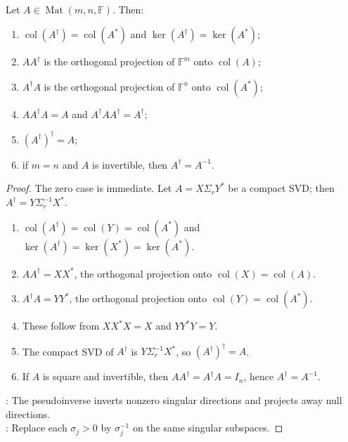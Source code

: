 \begin{theorem} \label{thm:moore-penrose-basic-properties} \\
Let $A\in\operatorname{Mat}(m,n,\mathbb{F})$. Then:
\begin{enumerate}[label=(\roman*)]
\setlength{\itemsep}{0pt}
\item $\operatorname{col}(A^{\dagger})=\operatorname{col}(A^*)$ and $\ker(A^{\dagger})=\ker(A^*)$;
\item $AA^{\dagger}$ is the orthogonal projection of $\mathbb{F}^m$ onto $\operatorname{col}(A)$;
\item $A^{\dagger}A$ is the orthogonal projection of $\mathbb{F}^n$ onto $\operatorname{col}(A^*)$;
\item $AA^{\dagger}A=A$ and $A^{\dagger}AA^{\dagger}=A^{\dagger}$;
\item $(A^{\dagger})^{\dagger}=A$;
\item if $m=n$ and $A$ is invertible, then $A^{\dagger}=A^{-1}$.
\end{enumerate}
\begin{proof}
The zero case is immediate. Let $A=X\Sigma_rY^*$ be a compact SVD; then $A^{\dagger}=Y\Sigma_r^{-1}X^*$.
\begin{enumerate}[label=(\roman*)]
\setlength{\itemsep}{0pt}
\item $\operatorname{col}(A^{\dagger})=\operatorname{col}(Y)=\operatorname{col}(A^*)$ and $\ker(A^{\dagger})=\ker(X^*)=\ker(A^*)$.
\item $AA^{\dagger}=XX^*$, the orthogonal projection onto $\operatorname{col}(X)=\operatorname{col}(A)$.
\item $A^{\dagger}A=YY^*$, the orthogonal projection onto $\operatorname{col}(Y)=\operatorname{col}(A^*)$.
\item These follow from $XX^*X=X$ and $YY^*Y=Y$.
\item The compact SVD of $A^{\dagger}$ is $Y\Sigma_r^{-1}X^*$, so $(A^{\dagger})^{\dagger}=A$.
\item If $A$ is square and invertible, then $AA^{\dagger}=A^{\dagger}A=I_n$, hence $A^{\dagger}=A^{-1}$.
\end{enumerate}
: The pseudoinverse inverts nonzero singular directions and projects away null directions.\\
: Replace each $\sigma_j>0$ by $\sigma_j^{-1}$ on the same singular subspaces.
\end{proof}
\end{theorem}

